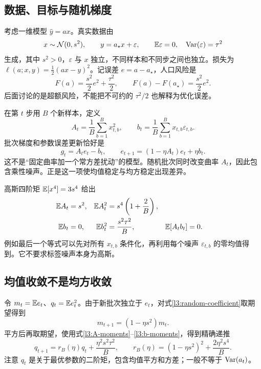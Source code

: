 \subsection{数据、目标与随机梯度}

考虑一维模型 $\hat y=ax$。真实数据由
\begin{equation}
 x\sim\mathcal N(0,s^2),\qquad y=a_\star x+\varepsilon,
 \qquad \mathbb E\varepsilon=0,\quad \operatorname{Var}(\varepsilon)=\tau^2
 \label{l3:gaussian-data}
\end{equation}
生成，其中 $s^2>0$，$\varepsilon$ 与 $x$ 独立，不同样本和不同步之间也独立。损失为 $\ell(a;x,y)=\tfrac12(ax-y)^2$。记误差 $e=a-a_\star$，人口风险是
\begin{equation}
 F(a)=\frac{s^2}{2}e^2+\frac{\tau^2}{2},\qquad
 F(a)-F(a_\star)=\frac{s^2}{2}e^2.
 \label{l3:regression-risk}
\end{equation}
后面讨论的是超额风险，不能把不可约的 $\tau^2/2$ 也解释为优化误差。

在第 $t$ 步用 $B$ 个新样本，定义
\[
 A_t=\frac1B\sum_{b=1}^{B}x_{t,b}^2,
 \qquad b_t=\frac1B\sum_{b=1}^{B}x_{t,b}\varepsilon_{t,b}.
\]
批次梯度和参数误差更新恰好是
\begin{equation}
 g_t=A_t e_t-b_t,\qquad
 e_{t+1}=(1-\eta A_t)e_t+\eta b_t.
 \label{l3:random-coefficient}
\end{equation}
这不是“固定曲率加一个常方差扰动”的模型。随机批次同时改变曲率 $A_t$，因此包含乘性噪声。正是这一项使均值稳定与均方稳定出现差异。

高斯四阶矩 $\mathbb E[x^4]=3s^4$ 给出
\begin{align}
 \mathbb E A_t&=s^2,&
 \mathbb E A_t^2&=s^4\left(1+\frac2B\right),\label{l3:A-moments}\\
 \mathbb E b_t&=0,&
 \mathbb E b_t^2&=\frac{s^2\tau^2}{B},&
 \mathbb E[A_t b_t]&=0.\label{l3:b-moments}
\end{align}
例如最后一个等式可以先对所有 $x_{t,b}$ 条件化，再利用每个噪声 $\varepsilon_{t,b}$ 的零均值得到。它不要求标签噪声本身为高斯。

\subsection{均值收敛不是均方收敛}

令 $m_t=\mathbb E e_t$、$q_t=\mathbb E e_t^2$。由于新批次独立于 $e_t$，对式\eqref{l3:random-coefficient}取期望得到
\begin{equation}
 m_{t+1}=(1-\eta s^2)m_t.
 \label{l3:mean-recurrence}
\end{equation}
平方后再取期望，使用式\eqref{l3:A-moments}--\eqref{l3:b-moments}，得到精确递推
\begin{equation}
 \boxed{q_{t+1}=r_B(\eta)q_t+\frac{\eta^2s^2\tau^2}{B}},
 \qquad
 r_B(\eta)=(1-\eta s^2)^2+\frac{2\eta^2s^4}{B}.
 \label{l3:mean-square-recurrence}
\end{equation}
注意 $q_t$ 是关于最优参数的二阶矩，包含均值平方和方差；一般不等于 $\operatorname{Var}(a_t)$。

